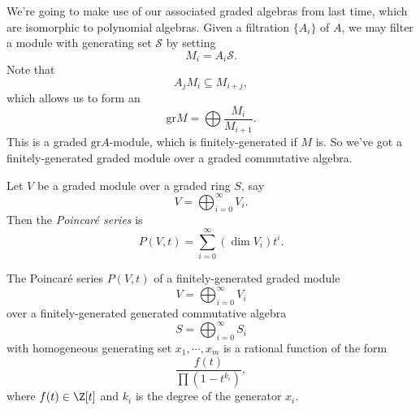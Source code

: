 \documentclass[a4paper]{article}
\renewcommand\Gr{\mathrm{gr}}
\begin{document}
We're going to make use of our associated graded algebras from last time, which are isomorphic to polynomial algebras. Given a filtration $\{A_i\}$ of $A$, we may filter a module with generating set $\mathcal{S}$ by setting
\[
  M_i = A_i \mathcal{S}.
\]
Note that
\[
  A_j M_i \subseteq M_{i + j},
\]
which allows us to form an 
\[
  \Gr M = \bigoplus \frac{M_i}{M_{i + 1}}.
\]\index{$\Gr M$}
This is a graded $\Gr A$-module, which is finitely-generated if $M$ is. So we've got a finitely-generated graded module over a graded commutative algebra.

\begin{defi}
  Let $V$ be a graded module over a graded ring $S$, say
  \[
    V = \bigoplus_{i = 0}^\infty V_i.
  \]
  Then the \emph{Poincar\'e series} is
  \[
    P(V, t) = \sum_{i = 0}^\infty (\dim V_i) t^i.
  \]
\end{defi}
\begin{thm}
  The Poincar\'e series $P(V, t)$ of a finitely-generated graded module
  \[
    V = \bigoplus_{i = 0}^\infty V_i
  \]
   over a finitely-generated generated commutative algebra
  \[
    S = \bigoplus_{i = 0}^\infty S_i
  \]
  with homogeneous generating set $x_1, \cdots, x_m$ is a rational function of the form
  \[
    \frac{f(t)}{\prod(1 - t^{k_i})},
  \]
  where $f(t) \in \Z[t]$ and $k_i$ is the degree of the generator $x_i$.
\end{thm}
\end{document}
